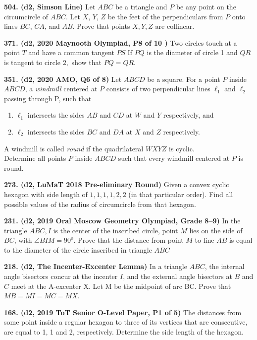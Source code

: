 \documentclass{article}
\begin{document}
\textbf{504. (\color{red}d2\color{black}, Simson Line)} Let $A B C$ be a triangle and $P$ be any point on the circumcircle of $ABC$. Let $X$, $Y$, $Z$ be the feet of the perpendiculars from $P$ onto lines $B C$, $C A$, and $A B$. Prove that points $X, Y, Z$ are collinear.

\textbf{371. (\color{red}d2\color{black}, 2020 Maynooth Olympiad, P8 of 10 )} Two circles touch at a point \(T\) and have a common tangent \(P S\) If \(P Q\) is the diameter of circle 1 and \(Q R\) is tangent to circle \(2,\) show that \(P Q=Q R\).

\textbf{351. (\color{red}d2\color{black}, 2020 AMO, Q6 of 8)} Let $ABCD$ be a square. For a point $P$ inside $ABCD$, a \textit{windmill} centered at $P$ consists of two perpendicular lines $\ell_1$ and $\ell_2$ passing through P, such that
\begin{enumerate}
    \item $\ell_1$ intersects the sides $AB$ and $CD$ at $W$ and $Y$ respectively, and
    \item $\ell_2$ intersects the sides $BC$ and $DA$ at $X$ and $Z$ respectively. \end{enumerate}
A windmill is called \textit{round} if the quadrilateral $WXYZ$ is cyclic. \\
Determine all points $P$ inside $ABCD$ such that every windmill centered at $P$ is round.

\textbf{273. (\color{red}d2\color{black}, LuMaT 2018 Pre-eliminary Round)} Given a convex cyclic hexagon with side length of $1,1,1,1,2,2$ (in that particular order). Find all possible values of the radius of circumcircle from that hexagon.

\textbf{231. (\color{red}d2\color{black}, 2019 Oral Moscow Geometry Olympiad, Grade 8--9)} In the triangle $ABC, I$ is the center of the inscribed circle, point $M$ lies on the side of $BC$, with $\angle BIM = 90^o$. Prove that the distance from point $M$ to line $AB$ is equal to the diameter of the circle inscribed in triangle $ABC$

\textbf{218. (\color{red}d2\color{black}, The Incenter-Excenter Lemma)} In a triangle $ABC$, the internal angle bisectors concur at the incenter $I$, and the external angle bisectors at $B$ and $C$ meet at the A-excenter X. Let M be the midpoint of arc BC. Prove that $MB=MI=MC=MX$.



\textbf{168. (\color{red}d2\color{black}, 2019 ToT Senior O-Level Paper, P1 of 5)} The distances from some point inside a regular hexagon to three of its vertices that are consecutive, are equal to 1, 1 and 2, respectively. Determine the side length of the hexagon.
\end{document}
